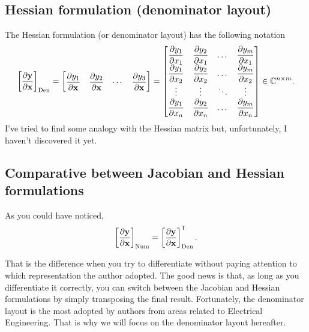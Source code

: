 \documentclass{article}
\newcommand{\trans}{\mathsf{T}}
\begin{document}
\subsection{Hessian formulation (denominator layout)}

The Hessian formulation (or denominator layout) has the following notation
\begin{align}
    \left[ \dfrac{\partial \mathbf{y}}{\partial \mathbf{x}} \right]_{\textnormal{Den}} = \begin{bmatrix}
        \dfrac{\partial y_1}{\partial \mathbf{x}} & \dfrac{\partial y_2}{\partial \mathbf{x}} & \cdots & \dfrac{\partial y_3}{\partial \mathbf{x}}
    \end{bmatrix} = \begin{bmatrix}
        \dfrac{\partial y_1}{\partial x_1} & \dfrac{\partial y_2}{\partial x_1} & \dots & \dfrac{\partial y_m}{\partial x_1} \\
        \dfrac{\partial y_1}{\partial x_2} & \dfrac{\partial y_2}{\partial x_2} & \dots & \dfrac{\partial y_m}{\partial x_2} \\
        \vdots & \vdots & \ddots & \vdots \\
        \dfrac{\partial y_1}{\partial x_n} & \dfrac{\partial y_2}{\partial x_n} & \dots & \dfrac{\partial y_m}{\partial x_n} \\
    \end{bmatrix} \in \mathbb{C}^{n\times m}.
\end{align}
I've tried to find some analogy with the Hessian matrix but, unfortunately, I haven't discovered it yet.

\subsection{Comparative between Jacobian and Hessian formulations}

As you could have noticed,
\begin{align}
    \left[ \dfrac{\partial \mathbf{y}}{\partial \mathbf{x}} \right]_{\textnormal{Num}} = \left[ \dfrac{\partial \mathbf{y}}{\partial \mathbf{x}} \right]_{\textnormal{Den}}^{\trans}.
\end{align}

That is the difference when you try to differentiate without paying attention to which representation the author adopted. The good news is that, as long as you differentiate it correctly, you can switch between the Jacobian and Hessian formulations by simply transposing the final result. Fortunately, the denominator layout is the most adopted by authors from areas related to Electrical Engineering. That is why we will focus on the denominator layout hereafter.
\end{document}
